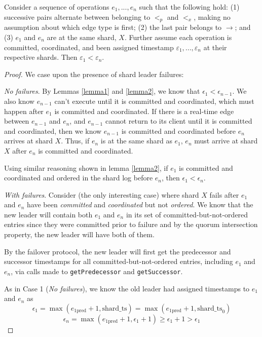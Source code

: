 \begin{lem}
\label{lemma3}
Consider a sequence of operations $e_1,...,e_n$ such that the following hold: (1) successive pairs alternate between belonging to $<_p$ and $<_x$, making no assumption about which edge type is first; (2) the last pair belongs to $\rightarrow$; and (3) $e_1$ and $e_n$ are at the same shard, $X$. Further assume each operation is committed, coordinated, and been assigned timestamp $\varepsilon_1, ..., \varepsilon_n$ at their respective shards. Then $\varepsilon_1 < \varepsilon_n$.
\end{lem}

\begin{proof}
We case upon the presence of shard leader failures:

 \textit{No failures}.
By Lemmas \ref{lemma1} and \ref{lemma2}, we know that $\epsilon_1 < \epsilon_{n-1}$. We also know $e_{n-1}$ can't execute until it is committed and coordinated, which must happen after $e_1$ is committed and coordinated. If there is a real-time edge between $e_{n-1}$ and $e_n$, and $e_{n-1}$ cannot return to its client until it is committed and coordinated, then we know $e_{n-1}$ is committed and coordinated before $e_n$ arrives at shard $X$. Thus, if $e_n$ is at the same shard as $e_1$, $e_n$ must arrive at shard $X$ after $e_n$ is committed and coordinated.

Using similar reasoning shown in lemma \ref{lemma2}, if $e_1$ is committed and coordinated and ordered in the shard log before $e_n$, then $\epsilon_1 < \epsilon_n$.

 \textit{With failures}.
Consider (the only interesting case) where shard $X$ fails after $e_1$ and $e_n$ have been \textit{committed} and \textit{coordinated} but not \textit{ordered}. We know that the new leader will contain both $e_1$ and $e_n$ in its set of committed-but-not-ordered entries since they were committed prior to failure and by the quorum intersection property, the new leader will have both of them.

By the failover protocol, the new leader will first get the predecessor and successor timestamps for all committed-but-not-ordered entries, including $e_1$ and $e_n$, via calls made to \texttt{getPredecessor} and \texttt{getSuccessor}.

As in Case 1 (\textit{No failures}), we know the old leader had assigned timestamps to $e_1$ and $e_n$ as
$$\epsilon_1 = \max(e_{1\text{pred}} + 1, \text{shard\_ts}) = \max(e_{1\text{pred}} + 1, \text{shard\_ts}_0)$$
$$\epsilon_n = \max(e_{1\text{pred}} + 1, \epsilon_1 + 1) \geq \epsilon_1 + 1 > \epsilon_1$$



\end{proof}
